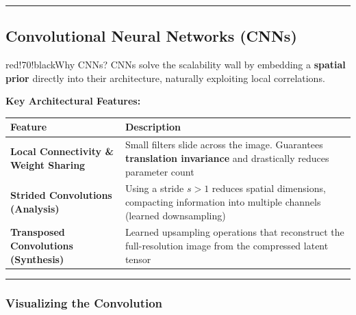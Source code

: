 \bigskip\hrule\bigskip

\subsection{Convolutional Neural Networks (CNNs)}

\begin{calloutbox}{red!70!black}{Why CNNs?}
CNNs solve the scalability wall by embedding a \textbf{spatial prior} directly into their architecture, naturally exploiting local correlations.
\end{calloutbox}

\textbf{Key Architectural Features:}

\begin{center}
\begin{tabular}{|l|l|}
\hline
\textbf{Feature} & \textbf{Description} \\ \hline
\textbf{Local Connectivity \& Weight Sharing} & Small filters slide across the image. Guarantees \textbf{translation invariance} and drastically reduces parameter count \\ \hline
\textbf{Strided Convolutions (Analysis)} & Using a stride $s > 1$ reduces spatial dimensions, compacting information into multiple channels (learned downsampling) \\ \hline
\textbf{Transposed Convolutions (Synthesis)} & Learned upsampling operations that reconstruct the full-resolution image from the compressed latent tensor \\ \hline
\end{tabular}
\end{center}

\bigskip\hrule\bigskip

\subsubsection{Visualizing the Convolution}


